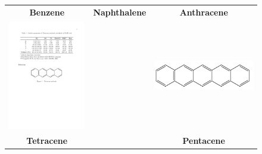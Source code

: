 \begin{figure}[p]
\begin{center}
{\begin{tabular}{c c c}
 			\textbf{Benzene} & \textbf{Naphthalene} & \textbf{Anthracene}\\
 			\includegraphics[scale=0.3]{image/tetracene} & & \includegraphics[scale=0.35]{image/pentacene}  \\
 			\textbf{Tetracene} & & \textbf{Pentacene}\\

\end{tabular}}
\end{center}
\end{figure}
